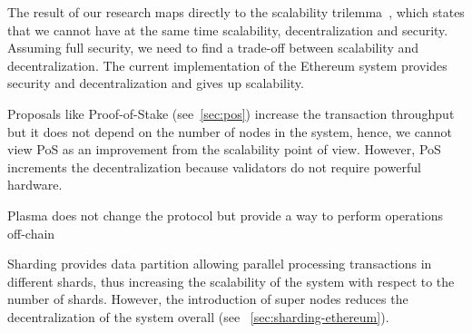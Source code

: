 The result of our research maps directly to the scalability
trilemma~\cite{bib:sharding-faq}, which states that we cannot have at the same
time scalability, decentralization and security. Assuming full security, we need
to find a trade-off between scalability and decentralization. The current
implementation of the Ethereum system provides security and decentralization and
gives up scalability.

Proposals like Proof-of-Stake (see~\autoref{sec:pos}) increase the transaction
throughput but it does not depend on the number of nodes in the system, hence,
we cannot view PoS as an improvement from the scalability point of view.
However, PoS increments the decentralization because validators do not require
powerful hardware.

Plasma does not change the protocol but provide a way to perform operations
off-chain

Sharding provides data partition allowing parallel processing transactions in
different shards, thus increasing the scalability of the system with respect to
the number of shards. However, the introduction of super nodes reduces the
decentralization of the system overall (see ~\autoref{sec:sharding-ethereum}).
